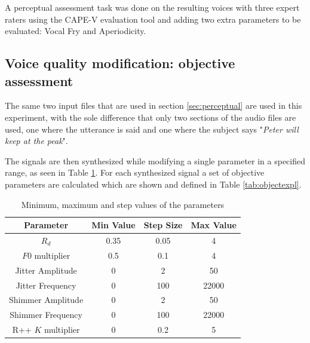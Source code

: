 \documentclass[final,5p,times,twocolumn]{elsarticle}
\begin{document}
A perceptual assessment task was done on the resulting voices with three expert raters using the CAPE-V evaluation tool \cite{Kempster2009} and adding two extra parameters to be evaluated: Vocal Fry and Aperiodicity.

\subsection{Voice quality modification: objective assessment}

The same two input files that are used in section \ref{sec:perceptual} are used in this experiment, with the sole difference that only two sections of the audio files are used, one where the  utterance is said and one where the subject says "\textit{Peter will keep at the peak}".

The signals are then synthesized while modifying a single parameter in a specified range, as seen in Table \ref{tab:paramrange}. For each synthesized signal a set of objective parameters are calculated which are shown and defined in Table \ref{tab:objectexpl}.

\begin{table}[!htpb]
    \centering
    \begin{tabular}{cccc}
        \hline \hline
        \textbf{Parameter}  & \textbf{Min Value} & \textbf{Step Size} & \textbf{Max Value} \\ \hline
        $R_d$               & 0.35               & 0.05               & 4                  \\
        $F0$ multiplier     & 0.5                & 0.1                & 4                  \\
        Jitter Amplitude    & 0                  & 2                  & 50                 \\
        Jitter Frequency    & 0                  & 100                & 22000              \\
        Shimmer Amplitude   & 0                  & 2                  & 50                 \\
        Shimmer Frequency   & 0                  & 100                & 22000              \\
        R++ $K$ multiplier  & 0                  & 0.2                & 5                  \\ \hline \hline
    \end{tabular}
    \caption{Minimum, maximum and step values of the parameters}
    \label{tab:paramrange}
\end{table}
\end{document}
